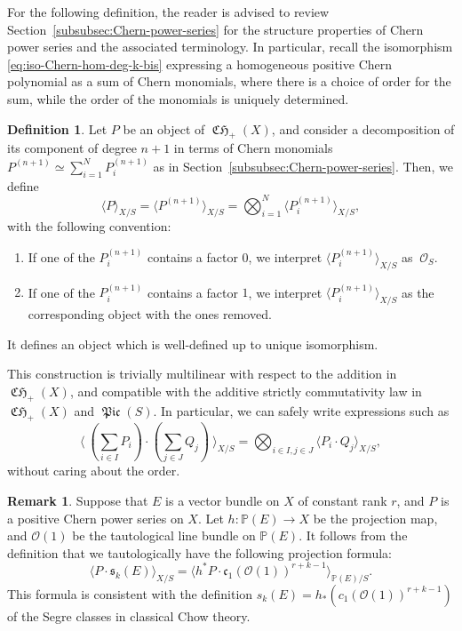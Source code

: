 \documentclass[11pt]{article}
\theoremstyle{plain}
\theoremstyle{definition}
\newtheorem{definition}[theorem]{Definition}
\newtheorem{remark}[theorem]{Remark}
\newcommand{\PBbb}{\mathbb P}
\newcommand{\Ocal}{\mathcal O}
\newcommand{\cfrak}{\mathfrak c}
\newcommand{\sfrak}{\mathfrak s}
\DeclareMathOperator{\CHfrak}{\mathfrak{CH}}
\DeclareMathOperator{\Picfr}{\mathfrak{Pic}}
\begin{document}
For the following definition, the reader is advised to review Section~\ref{subsubsec:Chern-power-series} for the structure properties of Chern power series and the associated terminology. In particular, recall the isomorphism \eqref{eq:iso-Chern-hom-deg-k-bis} expressing a homogeneous positive Chern polynomial as a sum of Chern monomials, where there is a choice of order for the sum, while the order of the monomials is uniquely determined.

\begin{definition}\label{def:Elkik-intersection-Chern-power}
Let $P$ be an object of $\CHfrak_{+}(X)$, and consider a decomposition of its component of degree $n+1$ in terms of Chern monomials $P^{(n+1)}\simeq\sum_{i=1}^{N}P_{i}^{(n+1)}$ as in Section~\ref{subsubsec:Chern-power-series}. Then, we define
\begin{displaymath}
\langle P\rangle_{X/S}=\langle P^{(n+1)}\rangle_{X/S}=\bigotimes_{i=1}^{N}\langle P_{i}^{(n+1)}\rangle_{X/S},
\end{displaymath}
with the following convention:
\begin{enumerate}
\item If one of the $P_{i}^{(n+1)}$ contains a factor $0$, we interpret $\langle P_{i}^{(n+1)} \rangle_{X/S} $ as $\ \Ocal_S$.
\item If one of the $P_{i}^{(n+1)}$ contains a factor $1$, we interpret $\langle P_{i}^{(n+1)} \rangle_{X/S} $ as the corresponding object with the ones removed.
\end{enumerate}
It defines an object which is well-defined up to unique isomorphism.

\end{definition}
This construction is trivially multilinear with respect to the addition in $\CHfrak_{+}(X)$, and compatible with the additive strictly commutativity law in $\CHfrak_{+}(X)$ and $\Picfr(S)$. In particular, we can safely write expressions such as
\begin{displaymath}
\langle\ (\sum_{i\in I} P_{i})\cdot (\sum_{j\in J}Q_{j})\ \rangle_{X/S}=\bigotimes_{i \in I,j \in J}\langle P_{i}\cdot Q_{j}\rangle_{X/S},
\end{displaymath}
without caring about the order.

\begin{remark}\label{rmk:taut-proj-form}
Suppose that $E$ is a vector bundle on $X$ of constant rank $r$, and $P$ is a positive Chern power series on $X$. Let $h\colon\PBbb(E)\to X$ be the projection map, and $\Ocal(1)$ be the tautological line bundle on $\PBbb(E)$. It follows from the definition that we tautologically have the following projection formula:
\begin{displaymath}
\langle P \cdot \sfrak_k(E) \rangle_{X/S} = \langle h^{\ast}P \cdot \cfrak_1(\Ocal(1))^{r+k-1} \rangle_{\PBbb(E)/S}.
\end{displaymath}
This formula is consistent with the definition $s_k(E) = h_\ast (c_1(\Ocal(1))^{r+k-1})$ of the Segre classes in classical Chow theory.
\end{remark}
\end{document}
